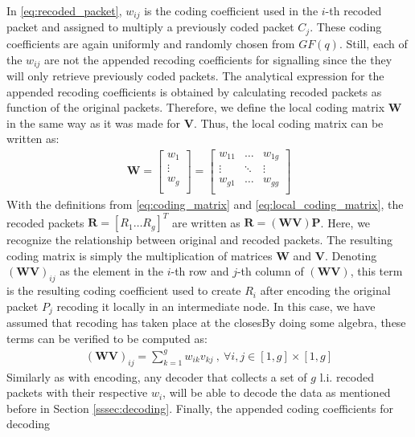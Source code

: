 In \eqref{eq:recoded_packet}, $w_{ij}$ is the coding coefficient used
in the $i$-th recoded packet and assigned to multiply a previously coded
packet $C_j$. These coding coefficients are again uniformly and randomly chosen
from $GF(q)$. Still, each of the $w_{ij}$ are not the appended recoding
coefficients for signalling since the they will only retrieve previously
coded packets. The analytical expression for the appended recoding
coefficients is obtained by calculating recoded packets as function of the
original packets. Therefore, we define the local coding matrix $\textbf{W}$
in the same way as it was made for $\textbf{V}$. Thus, the local coding matrix
can be written as:
%
\begin{align} \label{eq:local_coding_matrix}
\textbf{W} =
\left[
\begin{array}{c}
        w_1    \\ \hline
        \vdots \\ \hline
        w_g    \\
\end{array}
\right]
=
\left[
\begin{array}{ccc}
        w_{11} & \ldots & w_{1g} \\
        \vdots  & \ddots & \vdots  \\
        w_{g1} & \ldots & w_{gg} \\
\end{array}
\right]
\end{align}
%
With the definitions from \eqref{eq:coding_matrix} and
\eqref{eq:local_coding_matrix}, the recoded packets
$\textbf{R} = \left[R_1 \ldots R_g \right]^T$ are written as
$\textbf{R} = (\textbf{W} \textbf{V}) \textbf{P}$. Here, we recognize
the relationship between original and recoded packets. The resulting
coding matrix is simply the multiplication of matrices $\textbf{W}$ and
$\textbf{V}$. Denoting ${(\textbf{W} \textbf{V})}_{ij}$ as the element
in the $i$-th row and $j$-th column of $(\textbf{W} \textbf{V})$, this
term is the resulting coding coefficient used to create $R_i$ after
encoding the original packet $P_j$ recoding it locally in an intermediate
node. In this case, we have assumed that recoding has taken place at the
closesBy doing some algebra, these terms can be verified to be computed
as:
%
\begin{align}
\label{eq:appended_coded_coefficients}
{(\textbf{W} \textbf{V})}_{ij} = \sum_{k=1}^{g} w_{ik} v_{kj}\ ,\ \forall i,j \in [1,g] \times [1,g]
\end{align}
%
Similarly as with encoding, any decoder that collects a set
of $g$ \ac{l.i.} recoded packets with their respective $w_i$, will be able to
decode the data as mentioned before in Section \ref{sssec:decoding}. Finally,
the appended coding coefficients for decoding

